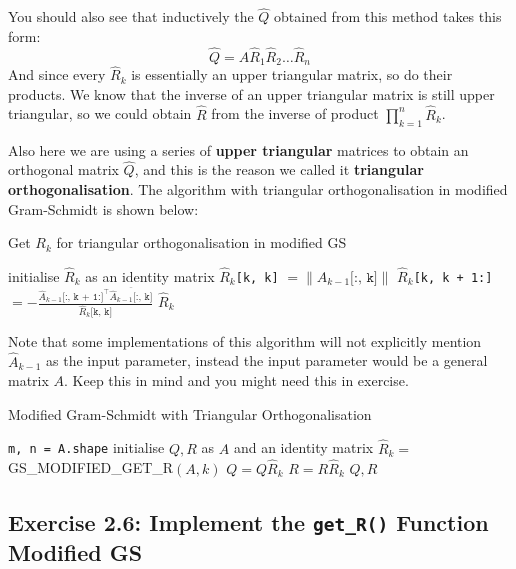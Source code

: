 \noindent You should also see that inductively the $\hat{Q}$ obtained from this method takes this form:
\[
\hat{Q} = A \hat{R}_1 \hat{R}_2 \ldots \hat{R}_n
\] 
And since every $\hat{R}_k$ is essentially an upper triangular matrix, so do their products. We know that the inverse of an upper triangular matrix is still upper triangular, so we could obtain $\hat{R}$ from the inverse of product $\prod_{k=1}^{n}\hat{R}_k$. \medskip

\noindent Also here we are using a series of \textbf{upper triangular} matrices to obtain an orthogonal matrix $\hat{Q}$, and this is the reason we called it \textbf{triangular orthogonalisation}. The algorithm with triangular orthogonalisation in modified Gram-Schmidt is shown below:

\begin{algorithm}[H]
  \caption{Get \(R_k\) for triangular orthogonalisation in modified GS}
  \label{mgs-get-r}
  \begin{algorithmic}[1]
    \State initialise \(\hat{R}_k\)  as an identity matrix
    \State \(\hat{R}_{k}\)\texttt{[k, k]} \(= \|\hat{A}_{k - 1}\texttt{[:, k]}\|\)
    \State \(\hat{R}_{k}\)\texttt{[k, k + 1:]} \(=- \frac{\hat{A}_{k - 1}\texttt{[:, k + 1:]}^{\top} \overline{\hat{A}_{k - 1}\texttt{[:, k]}}}{\hat{R}_{k}\texttt{[k, k]}}\)       
    \State \Return \(\hat{R}_k\)
  \EndProcedure
  \end{algorithmic}
  \end{algorithm}
\noindent Note that some implementations of this algorithm will not explicitly mention \(\hat{A}_{k - 1}\) as the input parameter, instead the input parameter would be a general matrix \(A\). Keep this in mind and you might need this in exercise. 
\begin{algorithm}[H]
  \caption{Modified Gram-Schmidt with Triangular Orthogonalisation}
  \label{mgs-r}
  \begin{algorithmic}[1]
    \State \texttt{m, n = A.shape}
    \State initialise \(Q, R\) as \(A\) and an identity matrix
      \State \(\hat{R}_k = \)  GS\_MODIFIED\_GET\_R\((A, k)\)
      \State \(Q = Q \hat{R}_{k}\)
      \State \(R = R \hat{R}_{k}\)     
    \EndFor
    \State \Return \(Q, R\)
  \EndProcedure
  \end{algorithmic}
  \end{algorithm}

  \subsection*{Exercise 2.6: Implement the \texttt{get\_R()} Function Modified GS}
